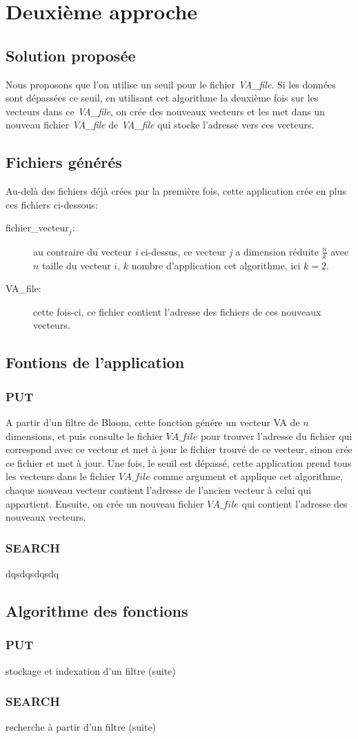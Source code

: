 \documentclass[a4paper,12pt]{report}
\begin{document}
\chapter{Deuxième approche}
\section{Solution proposée}
	Nous proposons que l'on utilise un seuil pour le fichier \emph{VA\_file}. Si les données sont dépassées ce seuil, en utilisant cet algorithme la deuxième fois sur les vecteurs dans ce \emph{VA\_file}, on crée des nouveaux vecteurs et les met dans un nouveau fichier \emph{VA\_file} de \emph{VA\_file} qui stocke l'adresse vers ces vecteurs.
\section{Fichiers générés}
	Au-delà des fichiers déjà crées par la première fois, cette application crée en plus ces fichiers ci-dessous:
	\begin{description}
		\item[fichier\_vecteur$_j$:] au contraire du vecteur \textit{i} ci-dessus, ce vecteur \textit{j} a dimension réduite $\frac{n}{k}$ avec $n$ taille du vecteur $i$, $k$ nombre d'application cet algorithme, ici $k = 2$.
		\item[VA\_file: ] cette fois-ci, ce fichier contient l'adresse des fichiers de ces nouveaux vecteurs.
	\end{description}
	
\section{Fontions de l'application}
\subsection{PUT}
	A partir d'un filtre de Bloom, cette fonction génére un vecteur VA de $n$ dimensions, et puis consulte le fichier $VA\_file$ pour trouver l'adresse du fichier qui correspond avec ce vecteur et met à jour le fichier trouvé de ce vecteur, sinon crée ce fichier et met à jour. Une fois, le seuil est dépassé, cette application prend tous les vecteurs dans le fichier $VA\_file$ comme argument et applique cet algorithme, chaque nouveau vecteur contient l'adresse de l'ancien vecteur à celui qui appartient. Ensuite, on crée un nouveau fichier $VA\_file$ qui contient l'adresse des nouveaux vecteurs.
\subsection{SEARCH}
dqsdqsdqsdq

\section{Algorithme des fonctions}
\subsection{PUT}
	\begin{algorithme}
		stockage et indexation d'un filtre (suite)
	\end{algorithme}
\subsection{SEARCH}
	\begin{algorithme}
		recherche à partir d'un filtre (suite)
	\end{algorithme} 
\end{document}

